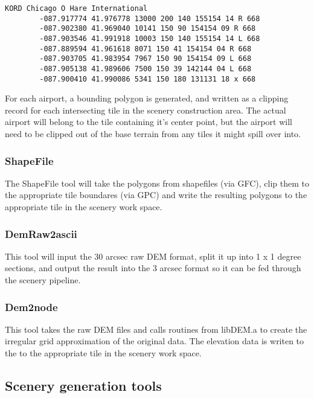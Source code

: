 \documentclass[12pt]{article}
\begin{document}
\begin{verbatim}
KORD Chicago O Hare International                       
        -087.917774 41.976778 13000 200 140 155154 14 R 668
        -087.902380 41.969040 10141 150 90 154154 09 R 668
        -087.903546 41.991918 10003 150 140 155154 14 L 668
        -087.889594 41.961618 8071 150 41 154154 04 R 668
        -087.903705 41.983954 7967 150 90 154154 09 L 668 
        -087.905138 41.989606 7500 150 39 142144 04 L 668
        -087.900410 41.990086 5341 150 180 131131 18 x 668
\end{verbatim}

For each airport, a bounding polygon is generated, and written as a
clipping record for each intersecting tile in the scenery construction
area.  The actual airport will belong to the tile containing it's
center point, but the airport will need to be clipped out of the base
terrain from any tiles it might spill over into.

\subsubsection{ShapeFile}

The ShapeFile tool will take the polygons from shapefiles (via GFC),
clip them to the appropriate tile boundares (via GPC) and write the
resulting polygons to the appropriate tile in the scenery work space.


\subsubsection{DemRaw2ascii}

This tool will input the 30 arcsec raw DEM format, split it up into 1
x 1 degree sections, and output the result into the 3 arcsec format so
it can be fed through the scenery pipeline.

\subsubsection{Dem2node}

This tool takes the raw DEM files and calls routines from libDEM.a to
create the irregular grid approximation of the original data.  The
elevation data is writen to the to the appropriate tile in the scenery
work space.

\subsection{Scenery generation tools}
\end{document}
